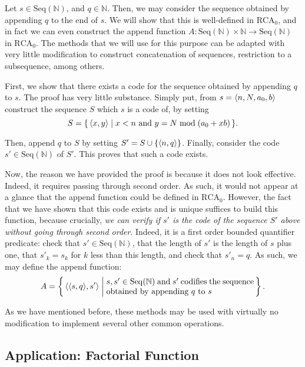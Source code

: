 \documentclass{article}
\theoremstyle{nonumberplain}
\newcommand{\N}{\mathbb{N}}
\newcommand{\RCA}{\mathrm{RCA}}
\newcommand{\Seq}{\mathrm{Seq}}
\DeclarePairedDelimiter{\braket}{\langle}{\rangle}
\begin{document}
Let $s \in \Seq(\N)$, and $q \in \N$. Then, we may consider the sequence obtained by appending $q$ to the end of $s$. We will show that this is well-defined in $\RCA_0$, and in fact we can even construct the append function $A \colon \Seq(\N) \times \N \to \Seq(\N)$ in $\RCA_0$. The methods that we will use for this purpose can be adapted with very little modification to construct concatenation of sequences, restriction to a subsequence, among others.

First, we show that there exists a code for the sequence obtained by appending $q$ to $s$. The proof has very little substance. Simply put, from $s = \braket{n,N,a_0,b}$ construct the sequence $S$ which $s$ is a code of, by setting
\begin{equation}
S = \{\, \braket{x,y} \mid x < n \text{ and } y = N \bmod (a_0 + x b) \,\}.
\end{equation}

Then, append $q$ to $S$ by setting $S' = S \cup \{\braket{n, q}\}$. Finally, consider the code $s' \in \Seq(\N)$ of $S'$. This proves that such a code exists.

Now, the reason we have provided the proof is because it does not look effective. Indeed, it requires passing through second order. As such, it would not appear at a glance that the append function could be defined in $\RCA_0$. However, the fact that we have shown that this code exists and is unique suffices to build this function, because crucially, \emph{we can verify if $s'$ is the code of the sequence $S'$ above without going through second order}. Indeed, it is a first order bounded quantifier predicate: check that $s' \in \Seq(\N)$, that the length of $s'$ is the length of $s$ plus one, that $s'_k = s_k$ for $k$ less than this length, and check that $s'_n = q$. As such, we may define the append function:
\begin{equation}
A = \left\{\, \braket{\braket{s,q}, s'} \;\middle|\; \parbox{18em}{$s, s' \in \Seq(\N)$ and $s'$ codifies the sequence obtained by appending $q$ to $s$}\,\right\}.
\end{equation}

As we have mentioned before, these methods may be used with virtually no modification to implement several other common operations.

\subsection{Application: Factorial Function}
\end{document}

